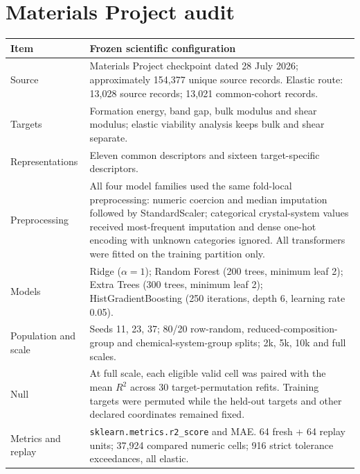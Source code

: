 \documentclass[11pt,a4paper,oneside]{report}
\begin{document}
\section*{Materials Project audit}
\begin{longtable}{p{}p{}}
\toprule Item & Frozen scientific configuration\\\midrule
Source & Materials Project checkpoint dated 28 July 2026; approximately 154,377 unique source records. Elastic route: 13,028 source records; 13,021 common-cohort records.\\
Targets & Formation energy, band gap, bulk modulus and shear modulus; elastic viability analysis keeps bulk and shear separate.\\
Representations & Eleven common descriptors and sixteen target-specific descriptors.\\
Preprocessing & All four model families used the same fold-local preprocessing: numeric coercion and median imputation followed by StandardScaler; categorical crystal-system values received most-frequent imputation and dense one-hot encoding with unknown categories ignored. All transformers were fitted on the training partition only.\\
Models & Ridge ($\alpha=1$); Random Forest (200 trees, minimum leaf 2); Extra Trees (300 trees, minimum leaf 2); HistGradientBoosting (250 iterations, depth 6, learning rate 0.05).\\
Population and scale & Seeds 11, 23, 37; 80/20 row-random, reduced-composition-group and chemical-system-group splits; 2k, 5k, 10k and full scales.\\
Null & At full scale, each eligible valid cell was paired with the mean $R^2$ across 30 target-permutation refits. Training targets were permuted while the held-out targets and other declared coordinates remained fixed.\\
Metrics and replay & \texttt{sklearn.metrics.r2\_score} and MAE. 64 fresh + 64 replay units; 37,924 compared numeric cells; 916 strict tolerance exceedances, all elastic.\\
\bottomrule
\end{longtable}
\end{document}

